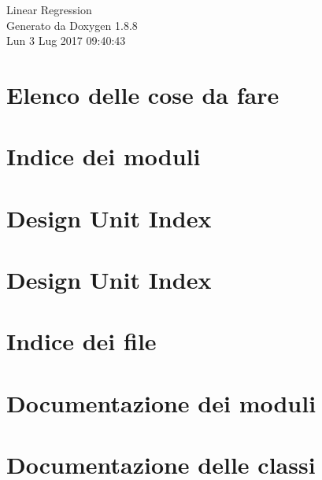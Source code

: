 \documentclass[twoside]{book}
\newcommand{\+}{\discretionary{\mbox{\scriptsize$\hookleftarrow$}}{}{}}
\newcommand{\clearemptydoublepage}{%
  \newpage{\pagestyle{empty}\cleardoublepage}%
}
\begin{document}
\hypersetup{pageanchor=false,
             bookmarks=true,
             bookmarksnumbered=true,
             pdfencoding=unicode
            }
\begin{titlepage}
\vspace*{7cm}
\begin{center}%
{\Large Linear Regression }\\
\vspace*{1cm}
{\large Generato da Doxygen 1.8.8}\\
\vspace*{0.5cm}
{\small Lun 3 Lug 2017 09:40:43}\\
\end{center}
\end{titlepage}
\clearemptydoublepage
\tableofcontents
\clearemptydoublepage
{}
\hypersetup{pageanchor=true}

\chapter{Elenco delle cose da fare}
\label{todo}
\hypertarget{todo}{}

\chapter{Indice dei moduli}

\chapter{Design Unit Index}

\chapter{Design Unit Index}

\chapter{Indice dei file}

\chapter{Documentazione dei moduli}





\chapter{Documentazione delle classi}




















\end{document}
